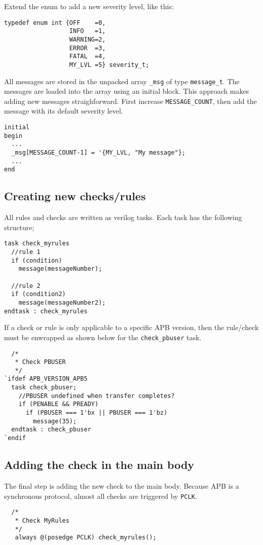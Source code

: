 \noindent
Extend the enum to add a new severity level, like this:

\begin{lstlisting}
typedef enum int {OFF    =0,
                  INFO   =1,
                  WARNING=2,
                  ERROR  =3,
                  FATAL  =4,
                  MY_LVL =5} severity_t;
\end{lstlisting}

\pagebreak
\noindent
All messages are stored in the unpacked array \texttt{\_msg} of type \texttt{message\_t}.
The messages are loaded into the array using an initial block. This approach makes adding new messages straighforward. First increase \texttt{MESSAGE\_COUNT}, then add the message with its default severity level.

\begin{lstlisting}
initial
begin
  ...
  _msg[MESSAGE_COUNT-1] = '{MY_LVL, "My message"};
  ...
end
\end{lstlisting}



\subsection{Creating new checks/rules}

All rules and checks are written as verilog tasks. Each task has the following structure;

\begin{lstlisting}
task check_myrules
  //rule 1
  if (condition)
    message(messageNumber);
    
  //rule 2
  if (condition2)
    message(messageNumber2);
endtask : check_myrules
\end{lstlisting}

\noindent
If a check or rule is only applicable to a specific APB version, then the rule/check must be enwrapped as shown below for the \texttt{check\_pbuser} task.

\begin{lstlisting}
  /*
   * Check PBUSER
   */
`ifdef APB_VERSION_APB5
  task check_pbuser;
    //PBUSER undefined when transfer completes?
    if (PENABLE && PREADY)
      if (PBUSER === 1'bx || PBUSER === 1'bz)
        message(35);
  endtask : check_pbuser
`endif
\end{lstlisting}



\subsection{Adding the check in the main body}

The final step is adding the new check to the main body. Because APB is a synchronous protocol, almost all checks are triggered by \texttt{PCLK}.

\begin{lstlisting}
  /*
   * Check MyRules
   */
   always @(posedge PCLK) check_myrules();
\end{lstlisting}


